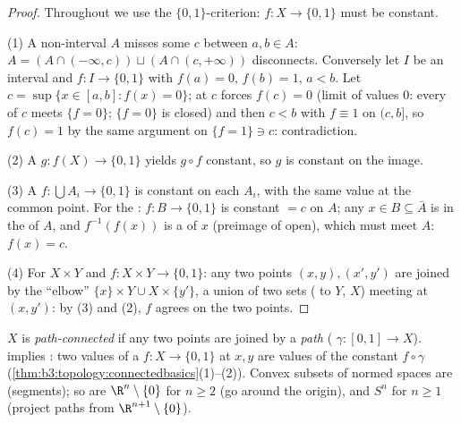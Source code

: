 \begin{proof}
Throughout we use the $\{0,1\}$-criterion: $f \colon X \to
\{0,1\}$  must be constant.

(1) A non-interval $A$ misses some $c$ between $a, b \in A$:
$A = (A \cap (-\infty, c)) \sqcup (A \cap (c, +\infty))$
disconnects. Conversely let $I$ be an interval and $f \colon I
\to \{0,1\}$  with $f(a) = 0$, $f(b) = 1$, $a < b$.
Let $c = \sup\{x \in [a,b] : f(x) = 0\}$;  at $c$
forces $f(c) = 0$ (limit of values $0$: every  of
$c$ meets $\{f = 0\}$; $\{f=0\}$ is closed) and then $c < b$
with $f \equiv 1$ on $(c, b]$, so $f(c) = 1$ by the same
 argument on $\{f = 1\} \ni c$: contradiction.

(2) A  $g \colon f(X) \to \{0,1\}$ yields $g \circ f$
constant, so $g$ is constant on the image.

(3) A  $f\colon \bigcup A_i \to \{0,1\}$ is constant
on each $A_i$, with the same value at the common point. For the
: $f \colon B \to \{0,1\}$ is constant $= c$ on $A$; any
$x \in B \subseteq \bar A$ is in the  of $A$, and $f^{-1}
(f(x))$ is a  of $x$ (preimage of open), which must
meet $A$: $f(x) = c$.

(4) For $X \times Y$ and $f\colon X\times Y \to \{0,1\}$: any
two points $(x,y), (x',y')$ are joined by the ``elbow''
$\{x\}\times Y \cup X \times \{y'\}$, a union of two 
sets ( to $Y$, $X$) meeting at $(x, y')$: by (3) and
(2), $f$ agrees on the two points.
\end{proof}

\begin{definition}\label{def:b3:topology:pathconnected}
$X$ is \emph{path-connected} if any
two points are joined by a \emph{path} ( $\gamma
\colon [0,1] \to X$).  implies : two
values of a  $f \colon X \to \{0,1\}$ at $x, y$ are
values of the constant $f\circ\gamma$
(\cref{thm:b3:topology:connectedbasics}(1)--(2)). Convex subsets
of normed spaces are  (segments); so are $\R^n
\setminus \{0\}$ for $n \geq 2$ (go around the origin), and
$S^n$ for $n \geq 1$ (project paths from $\R^{n+1}\setminus
\{0\}$).
\end{definition}

